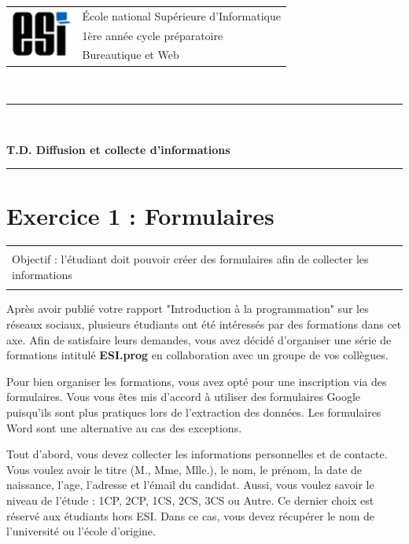\documentclass[11pt, a4paper]{article}
\begin{document}

\noindent
\begin{tabular}{ll}
\multirow{3}{*}{\includegraphics[width=2cm]{../esi-logo.png}} & \'Ecole national Supérieure d'Informatique\\
& 1ère année cycle préparatoire\\
& Bureautique et Web
\end{tabular}\\[.25cm]
\noindent\rule{\textwidth}{1pt}\\%
\begin{center}
{\LARGE \textbf{T.D. Diffusion et collecte d'informations}}
\end{center}
\noindent\rule{\textwidth}{1pt}

\section*{Exercice 1 : Formulaires}

\vspace{-12pt}
\begin{tabular}{|p{\textwidth}|}
	\hline\\
	Objectif : l'étudiant doit pouvoir créer des formulaires afin de collecter les informations   \\\\
	\hline
\end{tabular}

Après avoir publié votre rapport "Introduction à la programmation" sur les réseaux sociaux, plusieurs étudiants ont été intéressés par des formations dans cet axe. 
Afin de satisfaire leurs demandes, vous avez décidé d'organiser une série de formations intitulé \textbf{ESI.prog} en collaboration avec un groupe de vos collègues.

Pour bien organiser les formations, vous avez opté pour une inscription via des formulaires. 
Vous vous êtes mis d'accord à utiliser des formulaires Google puisqu'ils sont plus pratiques lors de l'extraction des données. 
Les formulaires Word sont une alternative au cas des exceptions. 

Tout d'abord, vous devez collecter les informations personnelles et de contacte. 
Vous voulez avoir le titre (M., Mme, Mlle.), le nom, le prénom, la date de naissance, l'age, l'adresse et l'émail du candidat. 
Aussi, vous voulez savoir le niveau de l'étude : 1CP, 2CP, 1CS, 2CS, 3CS ou Autre.
Ce dernier choix est réservé aux étudiants hors ESI. 
Dans ce cas, vous devez récupérer le nom de l'université ou l'école d'origine. 
\end{document}
